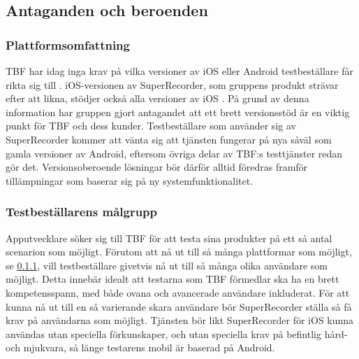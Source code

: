 \subsection{Antaganden och beroenden}
\subsubsection{Plattformsomfattning}
\label{subsubsec:plattformsomfattning}
TBF har idag inga krav på vilka versioner av iOS eller Android testbeställare får rikta sig till \parencite{betafaq}. iOS-versionen av SuperRecorder, som gruppens produkt strävar efter att likna, stödjer också alla versioner av iOS \parencite{superrec}. På grund av denna information har gruppen gjort antagandet att ett brett versionsstöd är en viktig punkt för TBF och dess kunder. Testbeställare som använder sig av SuperRecorder kommer att vänta sig att tjänsten fungerar på nya såväl som gamla versioner av Android, eftersom övriga delar av TBF:s testtjänster redan gör det. Versionsoberoende lösningar bör därför alltid föredras framför tillämpningar som baserar sig på ny systemfunktionalitet.

\subsubsection{Testbeställarens målgrupp}
Apputvecklare söker sig till TBF för att testa sina produkter på ett så antal scenarion som möjligt. Förutom att nå ut till så många plattformar som möjligt, se \ref{subsubsec:plattformsomfattning}, vill testbeställare givetvis nå ut till så många olika användare som möjligt. Detta innebär idealt att testarna som TBF förmedlar ska ha en brett kompetensspann, med både ovana och avancerade användare inkluderat. För att kunna nå ut till en så varierande skara användare bör SuperRecorder ställa så få krav på användarna som möjligt. Tjänsten bör likt SuperRecorder för iOS kunna användas utan speciella förkunskaper, och utan speciella krav på befintlig hård- och mjukvara, så länge testarens mobil är baserad på Android.
